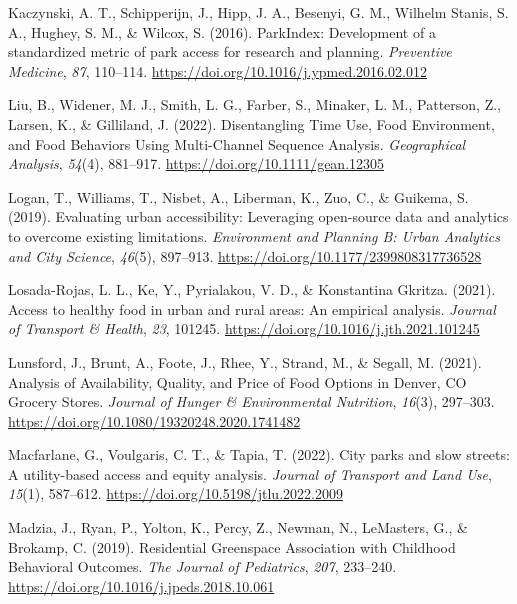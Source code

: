 \documentclass[
  letterpaper,
  authoryear,
  review,
  3p]{elsarticle}
\newlength{\cslhangindent}
\newlength{\cslentryspacingunit} %
\newenvironment{CSLReferences}[2] %
 {%
  \setlength{\parindent}{0pt}
  \ifodd #1
  \let\oldpar\par
  \def\par{\hangindent=\cslhangindent\oldpar}
  \fi
  \setlength{\parskip}{#2\cslentryspacingunit}
 }%
 {}
\begin{document}
\begin{CSLReferences}{1}{0}
\leavevmode{}%
Kaczynski, A. T., Schipperijn, J., Hipp, J. A., Besenyi, G. M., Wilhelm
Stanis, S. A., Hughey, S. M., \& Wilcox, S. (2016). {ParkIndex}:
{Development} of a standardized metric of park access for research and
planning. \emph{Preventive Medicine}, \emph{87}, 110--114.
\url{https://doi.org/10.1016/j.ypmed.2016.02.012}

\leavevmode{}%
Liu, B., Widener, M. J., Smith, L. G., Farber, S., Minaker, L. M.,
Patterson, Z., Larsen, K., \& Gilliland, J. (2022). Disentangling {Time
Use}, {Food Environment}, and {Food Behaviors Using Multi-Channel
Sequence Analysis}. \emph{Geographical Analysis}, \emph{54}(4),
881--917. \url{https://doi.org/10.1111/gean.12305}

\leavevmode{}%
Logan, T., Williams, T., Nisbet, A., Liberman, K., Zuo, C., \& Guikema,
S. (2019). Evaluating urban accessibility: Leveraging open-source data
and analytics to overcome existing limitations. \emph{Environment and
Planning B: Urban Analytics and City Science}, \emph{46}(5), 897--913.
\url{https://doi.org/10.1177/2399808317736528}

\leavevmode{}%
Losada-Rojas, L. L., Ke, Y., Pyrialakou, V. D., \& Konstantina Gkritza.
(2021). Access to healthy food in urban and rural areas: {An} empirical
analysis. \emph{Journal of Transport \& Health}, \emph{23}, 101245.
\url{https://doi.org/10.1016/j.jth.2021.101245}

\leavevmode{}%
Lunsford, J., Brunt, A., Foote, J., Rhee, Y., Strand, M., \& Segall, M.
(2021). Analysis of {Availability}, {Quality}, and {Price} of {Food
Options} in {Denver}, {CO Grocery Stores}. \emph{Journal of Hunger \&
Environmental Nutrition}, \emph{16}(3), 297--303.
\url{https://doi.org/10.1080/19320248.2020.1741482}

\leavevmode{}%
Macfarlane, G., Voulgaris, C. T., \& Tapia, T. (2022). City parks and
slow streets: {A} utility-based access and equity analysis.
\emph{Journal of Transport and Land Use}, \emph{15}(1), 587--612.
\url{https://doi.org/10.5198/jtlu.2022.2009}

\leavevmode{}%
Madzia, J., Ryan, P., Yolton, K., Percy, Z., Newman, N., LeMasters, G.,
\& Brokamp, C. (2019). Residential {Greenspace Association} with
{Childhood Behavioral Outcomes}. \emph{The Journal of Pediatrics},
\emph{207}, 233--240. \url{https://doi.org/10.1016/j.jpeds.2018.10.061}


\end{CSLReferences}
\end{document}
